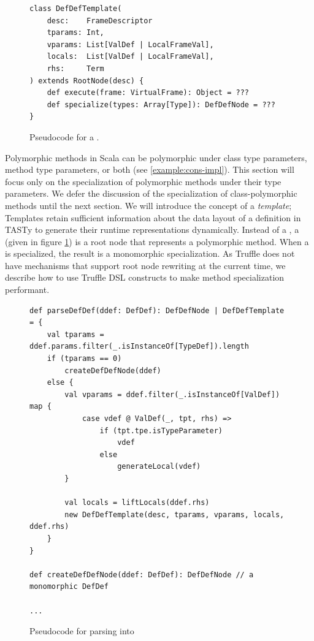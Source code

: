 \begin{figure}[!htb]
\begin{verbatim}
class DefDefTemplate(
	desc:    FrameDescriptor
	tparams: Int, 
	vparams: List[ValDef | LocalFrameVal], 
	locals:  List[ValDef | LocalFrameVal],
	rhs:     Term
) extends RootNode(desc) {
	def execute(frame: VirtualFrame): Object = ???
	def specialize(types: Array[Type]): DefDefNode = ???
}
\end{verbatim}
\caption{Pseudocode for a .}
\label{impl:defdeftemplate}
\end{figure}

Polymorphic methods in Scala can be polymorphic under class type parameters, method type parameters, or both (see \ref{example:cons-impl}). 
This section will focus only on the specialization of polymorphic methods under their type parameters.
We defer the discussion of the specialization of class-polymorphic methods until the next section.
We will introduce the concept of a \textit{template}; Templates retain sufficient information about the data layout of a definition in TASTy to generate their runtime representations dynamically.
Instead of a , a  (given in figure \ref{impl:defdeftemplate}) is a root node that represents a polymorphic method. 
When a  is specialized, the result is a monomorphic  specialization.
As Truffle does not have mechanisms that support root node rewriting at the current time, we describe how to use Truffle DSL constructs to make method specialization performant.

\begin{figure}[!htb]
\begin{verbatim}
def parseDefDef(ddef: DefDef): DefDefNode | DefDefTemplate = {		
	val tparams = ddef.params.filter(_.isInstanceOf[TypeDef]).length
	if (tparams == 0)
		createDefDefNode(ddef)
	else {
		val vparams = ddef.filter(_.isInstanceOf[ValDef]) map {
			case vdef @ ValDef(_, tpt, rhs) => 
				if (tpt.tpe.isTypeParameter) 
					vdef
				else
					generateLocal(vdef)
		}
	
		val locals = liftLocals(ddef.rhs)
		new DefDefTemplate(desc, tparams, vparams, locals, ddef.rhs)
	}
}

def createDefDefNode(ddef: DefDef): DefDefNode // a monomorphic DefDef
	
...
\end{verbatim}
\caption{Pseudocode for parsing  into }
\label{impl:parse-poly-defdef}
\end{figure}

